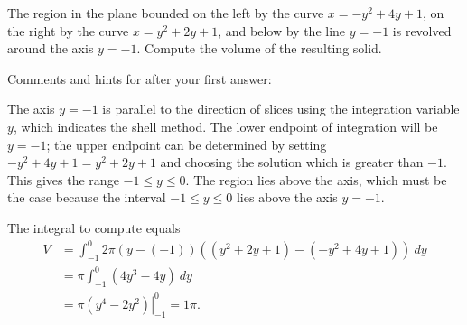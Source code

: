\documentclass{ximera}
\begin{document}
\begin{question}%

The region in the plane bounded on the left by the curve \(x=-y^2+4y+1\), on the right by the curve \(x=y^2+2y+1\), and below by the line \(y = -1\) is revolved around the axis \(y = -1\). Compute the volume of the resulting solid.
\begin{multiplechoice}
\choice[correct]{\(\pi\)}
\choice{\(5\pi\)}
\choice{\(9\pi\)}
\choice{\(13\pi\)}
\choice{\(17\pi\)}
\choice{\(21\pi\)}
\end{multiplechoice}
Comments and hints for after your first answer:
\begin{feedback}
The axis \(y = -1\) is parallel to the direction of slices using the integration variable \(y\), which indicates the shell method. The lower endpoint of integration will be \(y = -1\); the upper endpoint can be determined by setting \(-y^2+4y+1 = y^2+2y+1\) and choosing the solution which is greater than \(-1\). This gives the range \(-1 \leq y \leq 0\). 
 The region lies above the axis, which must be the case because the interval \(-1 \leq y \leq 0\) lies above the axis \(y = -1\).
 \begin{hint}
The integral to compute equals \[ \begin{aligned} V &= \int_{-1}^{0}2 \pi (y-(-1))((y^2+2y+1)-(-y^2+4y+1))~ dy\\
& = \pi \int_{-1}^{0} (4y^3-4y)~ dy\\
& = \pi \left. \left(y^4-2y^2\right) \right|_{-1}^{0} = 1\pi. \end{aligned}\]
\end{hint}
\end{feedback}

\end{question}
\end{document}
